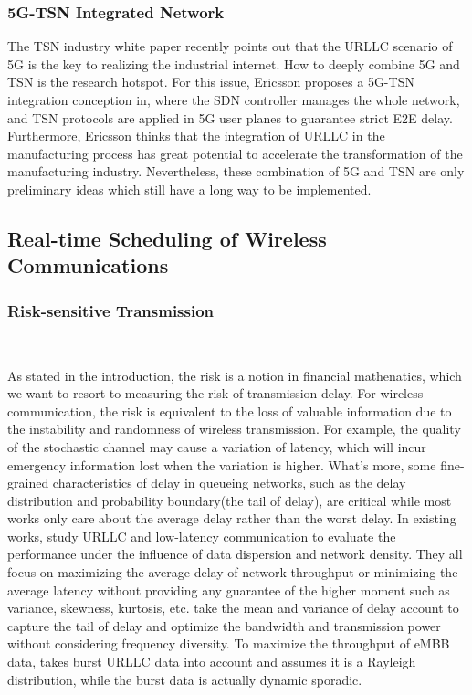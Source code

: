 \documentclass{SCIS2021}
\begin{document}
	\subsubsection{5G-TSN Integrated Network}
	The TSN industry white paper recently points out that the URLLC scenario of 5G is the key to realizing the industrial internet. How to deeply combine 5G and TSN is the research hotspot. For this issue, Ericsson proposes a 5G-TSN integration conception in\cite{farkas20195g}, where the SDN controller manages the whole network, and TSN protocols are applied in 5G user planes to guarantee strict E2E delay. Furthermore, Ericsson thinks that the integration of URLLC in the manufacturing process has great potential to accelerate the transformation of the manufacturing industry\cite{sachs2019boosting}. Nevertheless, these combination of 5G and TSN are only preliminary ideas which still have a long way to be implemented.

	\subsection{Real-time Scheduling of Wireless Communications}

	\subsubsection{Risk-sensitive Transmission}~{}

	As stated in the introduction, the risk is a notion in financial mathenatics\cite{follmer2004stochastic}, which we want to resort to measuring the risk of transmission delay. For wireless communication, the risk is equivalent to the loss of valuable information due to the instability and randomness of wireless transmission. For example, the quality of the stochastic channel may cause a variation of latency, which will incur emergency information lost when the variation is higher\cite{batewela2019risk}. What's more, some fine-grained characteristics of delay in queueing networks, such as the delay distribution and probability boundary(the tail of delay), are critical while most works only care about the average delay rather than the worst delay\cite{bennis2018ultrareliable}. In existing works, \cite{yang2018low,vu2018path} study URLLC and low-latency communication to evaluate the performance under the influence of data dispersion and network density. They all focus on maximizing the average delay of network throughput or minimizing the average latency without providing any guarantee of the higher moment such as variance, skewness, kurtosis, etc. \cite{vu2017ultra}\cite{assaad2011risk} take the mean and variance of delay account to capture the tail of delay and optimize the bandwidth and transmission power without considering frequency diversity. To maximize the throughput of eMBB data, \cite{alsenwi2019embb} takes burst URLLC data into account and assumes it is a Rayleigh distribution, while the burst data is actually dynamic sporadic.
\end{document}
